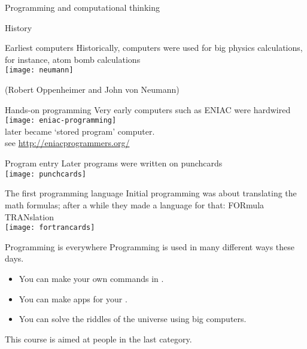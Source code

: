 
 {Programming and computational thinking}

 {History}

\begin{block}{Earliest computers}
  \label{sl:neumann}
  Historically, computers were used for big physics calculations, for
  instance, atom bomb calculations\\

  \texttt{[image: neumann]}

  (Robert Oppenheimer and John von Neumann)
\end{block}

\begin{block}{Hands-on programming}
  \label{sl:eniac}
  Very early computers such as ENIAC were hardwired\\
  \texttt{[image: eniac-programming]}\\
  later became `stored program' computer.\\
  see \url{http://eniacprogrammers.org/}
\end{block}

\begin{block}{Program entry}
  \label{sl:punch}
  Later programs were written on punchcards\\
  \texttt{[image: punchcards]}
\end{block}

\begin{block}{The first programming language}
  \label{sl:fcard}
  Initial programming was about translating the math formulas; after a
  while they made a language for that: FORmula TRANslation\\
  \texttt{[image: fortrancards]}
\end{block}

\begin{block}{Programming is everywhere}
  \label{sl:progeverywhere}
  Programming is used in many different ways these days.
  \begin{itemize}
  \item You can make your own commands in
    .
  \item You can make apps for your .
  \item You can solve the riddles of the universe using big computers.
  \end{itemize}
  This course is aimed at people in the last category.
\end{block}

